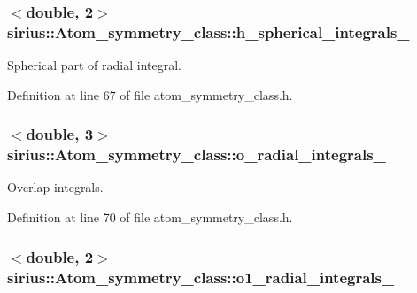 \subsubsection[{h\+\_\+spherical\+\_\+integrals\+\_\+}]{$<$double, 2$>$ sirius\+::\+Atom\+\_\+symmetry\+\_\+class\+::h\+\_\+spherical\+\_\+integrals\+\_\+\hspace{0.3cm}{\ttfamily [private]}}\label{classsirius_1_1_atom__symmetry__class_a67ce6c9408276241634a0108beb18ce1}


Spherical part of radial integral. 



Definition at line 67 of file atom\+\_\+symmetry\+\_\+class.\+h.

\hypertarget{classsirius_1_1_atom__symmetry__class_aee287b3e0ec23fb68ecb742490ca1fdb}{}
\subsubsection[{o\+\_\+radial\+\_\+integrals\+\_\+}]{$<$double, 3$>$ sirius\+::\+Atom\+\_\+symmetry\+\_\+class\+::o\+\_\+radial\+\_\+integrals\+\_\+\hspace{0.3cm}{\ttfamily [private]}}\label{classsirius_1_1_atom__symmetry__class_aee287b3e0ec23fb68ecb742490ca1fdb}


Overlap integrals. 



Definition at line 70 of file atom\+\_\+symmetry\+\_\+class.\+h.

\hypertarget{classsirius_1_1_atom__symmetry__class_a5b103e070ac0676a0ce627a8ce654b75}{}
\subsubsection[{o1\+\_\+radial\+\_\+integrals\+\_\+}]{$<$double, 2$>$ sirius\+::\+Atom\+\_\+symmetry\+\_\+class\+::o1\+\_\+radial\+\_\+integrals\+\_\+\hspace{0.3cm}{\ttfamily [private]}}\label{classsirius_1_1_atom__symmetry__class_a5b103e070ac0676a0ce627a8ce654b75}


